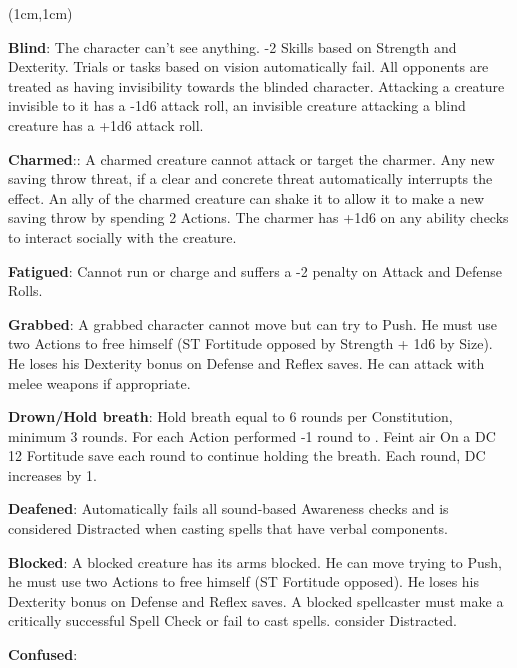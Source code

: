 \documentclass[a4paper,12 pt,openany]{book}
\begin{document}
\center

\footnotesize

\begin{textblock*}{19 cm}(1cm,1cm) %
\flushleft

\begin{multicols}{2}

\textbf{Blind}: The character can't see anything. -2 Skills based on Strength and Dexterity. Trials or tasks based on vision automatically fail. All opponents are treated as having invisibility towards the blinded character. Attacking a creature invisible to it has a -1d6 attack roll, an invisible creature attacking a blind creature has a +1d6 attack roll.

\textbf{Charmed}:: A charmed creature cannot attack or target the charmer. Any new saving throw threat, if a clear and concrete threat automatically interrupts the effect. An ally of the charmed creature can shake it to allow it to make a new saving throw by spending 2 Actions. The charmer has +1d6 on any ability checks to interact socially with the creature.

\textbf{Fatigued}: Cannot run or charge and suffers a -2 penalty on Attack and Defense Rolls.

\textbf{Grabbed}: A grabbed character cannot move but can try to Push. He must use two Actions to free himself (ST Fortitude opposed by Strength + 1d6 by Size). He loses his Dexterity bonus on Defense and Reflex saves. He can attack with melee weapons if appropriate.

\textbf{Drown/Hold breath}:  Hold breath equal to 6 rounds per Constitution, minimum 3 rounds. For each Action performed -1 round to . Feint air On a DC 12 Fortitude save each round to continue holding the breath. Each round, DC increases by 1.

\textbf{Deafened}: Automatically fails all sound-based Awareness checks and is considered Distracted when casting spells that have verbal components.

\textbf{Blocked}: A blocked creature has its arms blocked. He can move trying to Push, he must use two Actions to free himself (ST Fortitude opposed). He loses his Dexterity bonus on Defense and Reflex saves. A blocked spellcaster must make a critically successful Spell Check or fail to cast spells. consider Distracted.

\textbf{Confused}: 


\end{multicols}
\end{textblock*}
\end{document}

